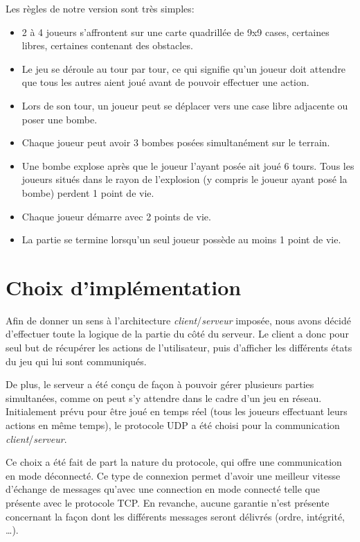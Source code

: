 Les règles de notre version sont très simples:
\begin{itemize}
	\item 2 à 4 joueurs s'affrontent sur une carte quadrillée de 9x9 cases, certaines libres, certaines contenant des obstacles.
    \item Le jeu se déroule au tour par tour, ce qui signifie qu'un joueur doit attendre que tous les autres aient joué avant de pouvoir effectuer une action.
    \item Lors de son tour, un joueur peut se déplacer vers une case libre adjacente ou poser une bombe.
    \item Chaque joueur peut avoir 3 bombes posées simultanément sur le terrain.
    \item Une bombe explose après que le joueur l'ayant posée ait joué 6 tours. Tous les joueurs situés dans le rayon de l'explosion (y compris le joueur ayant posé la bombe) perdent 1 point de vie.
    \item Chaque joueur démarre avec 2 points de vie.
    \item La partie se termine lorsqu'un seul joueur possède au moins 1 point de vie.
\end{itemize}

\section*{Choix d'implémentation}

Afin de donner un sens à l'architecture \textit{client}/\textit{serveur} imposée, nous avons décidé d'effectuer toute la logique de la partie du côté du serveur. Le client a donc pour seul but de récupérer les actions de l'utilisateur, puis d'afficher les différents états du jeu qui lui sont communiqués.

De plus, le serveur a été conçu de façon à pouvoir gérer plusieurs parties simultanées, comme on peut s'y attendre dans le cadre d'un jeu en réseau.\\

Initialement prévu pour être joué en temps réel (tous les joueurs effectuant leurs actions en même temps), le protocole UDP a été choisi pour la communication \textit{client}/\textit{serveur}.

Ce choix a été fait de part la nature du protocole, qui offre une communication en mode déconnecté. Ce type de connexion permet d'avoir une meilleur vitesse d'échange de messages qu'avec une connection en mode connecté telle que présente avec le protocole TCP. En revanche, aucune garantie n'est présente concernant la façon dont les différents messages seront délivrés (ordre, intégrité, \dots).\\

